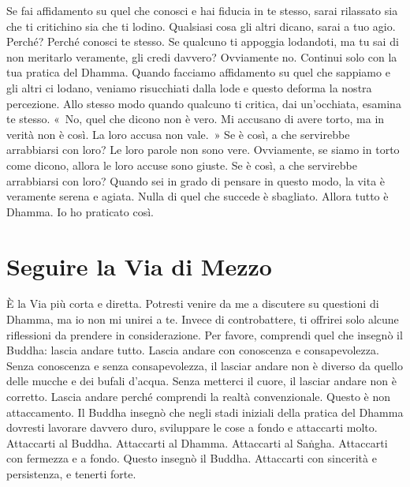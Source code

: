 Se fai affidamento su quel che conosci e hai fiducia in te stesso, sarai
rilassato sia che ti critichino sia che ti lodino. Qualsiasi cosa gli
altri dicano, sarai a tuo agio. Perché? Perché conosci te stesso. Se
qualcuno ti appoggia lodandoti, ma tu sai di non meritarlo veramente,
gli credi davvero? Ovviamente no. Continui solo con la tua pratica del
Dhamma. Quando facciamo affidamento su quel che sappiamo e gli altri ci
lodano, veniamo risucchiati dalla lode e questo deforma la nostra
percezione. Allo stesso modo quando qualcuno ti critica, dai
un'occhiata, esamina te stesso. «~No, quel che dicono non è vero. Mi
accusano di avere torto, ma in verità non è così. La loro accusa non
vale.~» Se è così, a che servirebbe arrabbiarsi con loro? Le loro parole
non sono vere. Ovviamente, se siamo in torto come dicono, allora le loro
accuse sono giuste. Se è così, a che servirebbe arrabbiarsi con loro?
Quando sei in grado di pensare in questo modo, la vita è veramente
serena e agiata. Nulla di quel che succede è sbagliato. Allora tutto è
Dhamma. Io ho praticato così.

\section{Seguire la Via di Mezzo}

È la Via più corta e diretta. Potresti venire da me a discutere su
questioni di Dhamma, ma io non mi unirei a te. Invece di controbattere,
ti offrirei solo alcune riflessioni da prendere in considerazione. Per
favore, comprendi quel che insegnò il Buddha: lascia andare tutto.
Lascia andare con conoscenza e consapevolezza. Senza conoscenza e senza
consapevolezza, il lasciar andare non è diverso da quello delle mucche e
dei bufali d'acqua. Senza metterci il cuore, il lasciar andare non è
corretto. Lascia andare perché comprendi la realtà convenzionale. Questo
è non attaccamento. Il Buddha insegnò che negli stadi iniziali della
pratica del Dhamma dovresti lavorare davvero duro, sviluppare le cose a
fondo e attaccarti molto. Attaccarti al Buddha. Attaccarti al Dhamma.
Attaccarti al Saṅgha. Attaccarti con fermezza e a fondo. Questo insegnò
il Buddha. Attaccarti con sincerità e persistenza, e tenerti forte.

